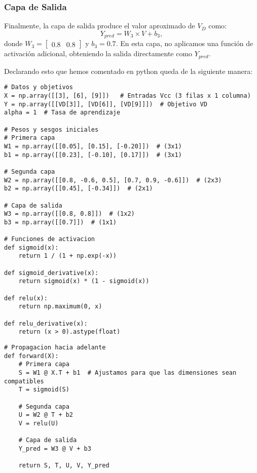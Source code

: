 \documentclass[paper=a4, fontsize=11pt]{scrartcl} %
\numberwithin{equation}{section} %
\numberwithin{figure}{section} %
\numberwithin{table}{section} %
\begin{document}
\subsubsection{Capa de Salida}

Finalmente, la capa de salida produce el valor aproximado de $V_D$ como:
\[
Y_{pred} = W_3 \times V + b_3,
\]
donde $W_3 = \begin{bmatrix} 0.8 & 0.8 \end{bmatrix}$ y $b_3 = 0.7$. En esta capa, no aplicamos una función de activación adicional, obteniendo la salida directamente como $Y_{pred}$.

Declarando esto que hemos comentado en python queda de la siguiente manera:

\vspace{2mm}
\begin{lstlisting}
# Datos y objetivos
X = np.array([[3], [6], [9]])   # Entradas Vcc (3 filas x 1 columna)
Y = np.array([[VD[3]], [VD[6]], [VD[9]]])  # Objetivo VD
alpha = 1  # Tasa de aprendizaje

# Pesos y sesgos iniciales
# Primera capa
W1 = np.array([[0.05], [0.15], [-0.20]])  # (3x1)
b1 = np.array([[0.23], [-0.10], [0.17]])  # (3x1)

# Segunda capa
W2 = np.array([[0.8, -0.6, 0.5], [0.7, 0.9, -0.6]])  # (2x3)
b2 = np.array([[0.45], [-0.34]])  # (2x1)

# Capa de salida
W3 = np.array([[0.8, 0.8]])  # (1x2)
b3 = np.array([[0.7]])  # (1x1)

# Funciones de activacion
def sigmoid(x):
    return 1 / (1 + np.exp(-x))

def sigmoid_derivative(x):
    return sigmoid(x) * (1 - sigmoid(x))

def relu(x):
    return np.maximum(0, x)

def relu_derivative(x):
    return (x > 0).astype(float)
\end{lstlisting}
\vspace{10mm}
\begin{lstlisting}
# Propagacion hacia adelante
def forward(X):
    # Primera capa
    S = W1 @ X.T + b1  # Ajustamos para que las dimensiones sean compatibles
    T = sigmoid(S)

    # Segunda capa
    U = W2 @ T + b2
    V = relu(U)

    # Capa de salida
    Y_pred = W3 @ V + b3

    return S, T, U, V, Y_pred
\end{lstlisting}
\end{document}
